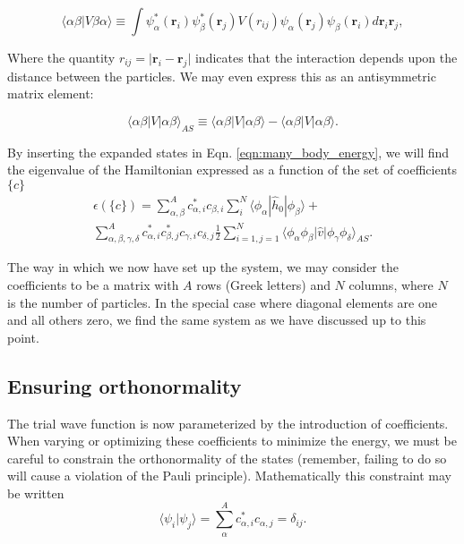 \begin{equation}
\langle \alpha \beta \vert V \beta \alpha \rangle \equiv \int \psi_\alpha^*(\mathbf{r}_i) \psi_\beta^*(\mathbf{r}_j) V(r_{ij})  \psi_\alpha(\mathbf{r}_j) \psi_\beta(\mathbf{r}_i) d\mathbf{r}_i\mathbf{r}_j,
\end{equation}

Where the quantity $r_{ij} = \vert \mathbf{r}_i - \mathbf{r}_j \vert$ indicates that the interaction depends upon the distance between the particles. We may even express this as an antisymmetric matrix element:

\begin{equation}
\langle \alpha \beta \vert V \vert \alpha \beta \rangle_{AS}  \equiv \langle \alpha \beta \vert V \vert \alpha \beta \rangle - \langle \alpha \beta \vert V \vert \alpha \beta \rangle.
\end{equation}

By inserting the expanded states in Eqn. \ref{eqn:many_body_energy}, we will find the eigenvalue of the Hamiltonian expressed as a function of the set of coefficients $\{c\}$
\begin{multline}
 \epsilon (\{c\}) = \sum _{\alpha, \beta}^A c_{\alpha,i}^{*}c_{\beta,i} \sum _{i}^N \langle \phi _\alpha | \hat{h}_0 | \phi _\beta \rangle + \\ 
 \sum _{\alpha,\beta, \gamma, \delta} ^A c_{\alpha,i}^{*}c_{\beta,j}^{*}c_{\gamma,i}c_{\delta,j}
 \frac{1}{2} \sum _{i=1,j=1}^N \langle \phi _{\alpha}\phi _{\beta}| \hat{v} |\phi _{\gamma}\phi _{\delta} \rangle_{AS}.
\label{eqn:greek_HF}
\end{multline}

The way in which we now have set up the system, we may consider the
coefficients to be a matrix with $A$ rows (Greek letters) and $N$
columns, where $N$ is the number of particles. In the special case
where diagonal elements are one and all others zero, we find the same
system as we have discussed up to this point.

\subsection{Ensuring orthonormality}

The trial wave function is now parameterized by the introduction of
coefficients. When varying or optimizing these coefficients to
minimize the energy, we must be careful to constrain the
orthonormality of the states (remember, failing to do so will cause a
violation of the Pauli principle). Mathematically this constraint may
be written
\begin{equation}
\langle \psi_i \vert \psi_j \rangle = \sum_{\alpha}^A c_{\alpha, i}^*c_{\alpha, j} = \delta_{ij}.
\label{eqn:orthonormality}
\end{equation}

